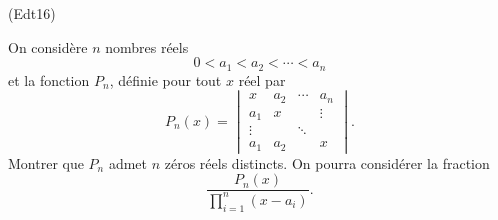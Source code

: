 \begin{tiny}(Edt16)\end{tiny} On considère $n$ nombres réels
\begin{displaymath}
 0 < a_1 < a_2 < \cdots < a_n
\end{displaymath}
 et la fonction $P_n$, définie pour tout $x$ réel par
\begin{displaymath}
 P_n(x)=
\begin{vmatrix}
x      & a_2 & \cdots & a_n    \\
a_1    & x   &        & \vdots \\
\vdots &     & \ddots &        \\
a_1    & a_2 &        & x
\end{vmatrix}.
\end{displaymath}
Montrer que $P_n$ admet $n$ zéros réels distincts. On pourra considérer la fraction
\begin{displaymath}
 \frac{P_n(x)}{\prod_{i=1}^n(x-a_i)}.
\end{displaymath}
